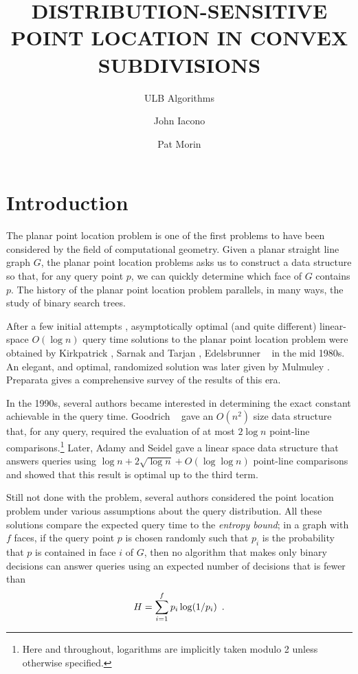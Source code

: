 \documentclass[charterfonts,lotsofwhite]{patmorin}
\title{\MakeUppercase{Distribution-Sensitive Point Location in Convex
Subdivisions}}
\author{ULB Algorithms \and John Iacono \and Pat Morin}
\date{}
\begin{document}
\maketitle

\section{Introduction}

The planar point location problem is one of the first problems to have
been considered by the field of computational geometry. Given a planar
straight line graph $G$, the planar point location problems asks us to
construct a data structure so that, for any query point $p$, we can
quickly determine which face of $G$ contains $p$.  The history of the
planar point location problem parallels, in many ways, the study of
binary search trees.

After a few initial attempts \cite{dl76,lp77,p81}, asymptotically
optimal (and quite different) linear-space $O(\log n)$ query time
solutions to the planar point location problem were obtained by
Kirkpatrick \cite{28}, Sarnak and Tarjan \cite{46}, Edelsbrunner
\etal\ \cite{24} in the mid 1980s.  An elegant, and optimal,
randomized solution was later given by Mulmuley \cite{34}.  Preparata
\cite{p} gives a comprehensive survey of the results of this era.

In the 1990s, several authors became interested in determining the
exact constant achievable in the query time.  Goodrich \etal\
\cite{26} gave an $O(n^2)$ size data structure that, for any query,
required the evaluation of at most $2\log n$ point-line
comparisons.\footnote{Here and throughout, logarithms are implicitly
taken modulo 2 unless otherwise specified.} Later, Adamy and Seidel
\cite{1} gave a linear space data structure that answers queries using
$\log n + 2\sqrt{\log n} + O(\log\log n)$ point-line comparisons and
showed that this result is optimal up to the third term.

Still not done with the problem, several authors considered the point
location problem under various assumptions about the query
distribution.  All these solutions compare the expected query time to
the \emph{entropy bound};  in a graph with $f$ faces, if the query point
$p$ is chosen randomly such that $p_i$ is the probability that $p$ is
contained in face $i$ of $G$, then no algorithm that makes only binary
decisions can answer queries using an expected number of decisions
that is fewer than 
\begin{equation}
    H = \sum_{i=1}^f p_i\log(1/p_i) \enspace . \eqlabel{entropy}
\end{equation}
\end{document}
